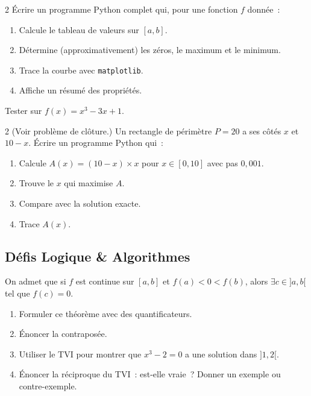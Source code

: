 \begin{bilan}
\begin{probleme}{2}
\'Ecrire un programme Python complet qui, pour une fonction $f$ donn\'ee~:
\begin{enumerate}
  \item Calcule le tableau de valeurs sur $[a,b]$.
  \item D\'etermine (approximativement) les z\'eros, le maximum et le minimum.
  \item Trace la courbe avec \texttt{matplotlib}.
  \item Affiche un r\'esum\'e des propri\'et\'es.
\end{enumerate}
Tester sur $f(x)=x^3-3x+1$.
\end{probleme}

\begin{probleme}{2}
(Voir probl\`eme de cl\^oture.)
Un rectangle de p\'erim\`etre $P=20$ a ses c\^ot\'es $x$ et $10-x$.
\'Ecrire un programme Python qui~:
\begin{enumerate}
  \item Calcule $A(x)=(10-x)\times x$ pour $x\in[0,10]$ avec pas $0{,}001$.
  \item Trouve le $x$ qui maximise $A$.
  \item Compare avec la solution exacte.
  \item Trace $A(x)$.
\end{enumerate}
\end{probleme}

\subsection*{D\'efis Logique \& Algorithmes}

\begin{challenge}
On admet que si $f$ est continue sur $[a,b]$ et $f(a)<0<f(b)$,
alors $\exists c\in]a,b[$ tel que $f(c)=0$.
\begin{enumerate}
  \item Formuler ce th\'eor\`eme avec des quantificateurs.
  \item \'Enoncer la contrapos\'ee.
  \item Utiliser le TVI pour montrer que $x^3-2=0$ a une solution dans $]1,2[$.
  \item \'Enoncer la r\'eciproque du TVI~: est-elle vraie~?
        Donner un exemple ou contre-exemple.
\end{enumerate}
\end{challenge}


\end{bilan}
